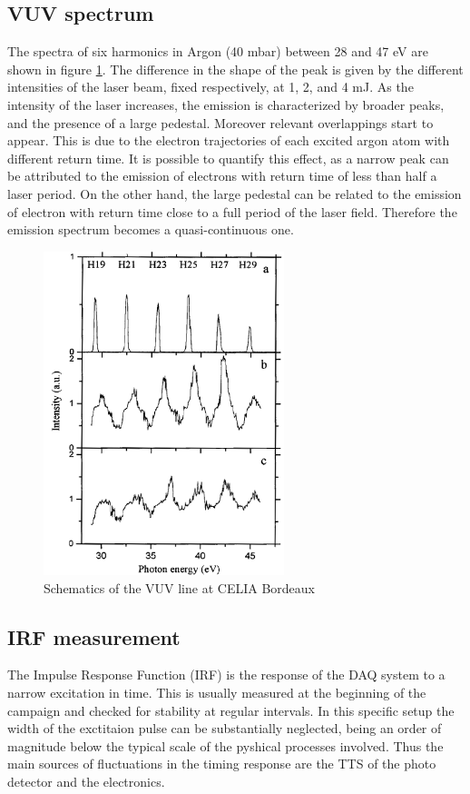 \subsection{VUV spectrum}
The spectra of six harmonics in Argon (40 mbar) between 28 and 47 eV are shown in figure \ref{fig:VUV_spectrum}.
The difference in the shape of the peak is given by the different intensities of the laser beam, fixed respectively, at 1, 2, and 4 mJ.
As the intensity of the laser increases, the emission is characterized by broader peaks, and the presence of a large pedestal.
Moreover relevant overlappings start to appear.
This is due to the electron trajectories of each excited argon atom with different return time.
It is possible to quantify this effect, as a narrow peak can be attributed to the emission of electrons with return time of less than half a laser period.
On the other hand, the large pedestal can be related to the emission of electron with return
time close to a full period of the laser field.
Therefore the emission spectrum becomes a quasi-continuous one.

\begin{figure}[htbp]
\begin{center}
\includegraphics[width=7cm]{../Pictures/Chapter_7/VUV_spectrum.png}
\end{center}
\caption[VUV spectrum]{Schematics of the VUV line at CELIA Bordeaux \cite{Martin2001}}
\label{fig:VUV_spectrum}
\end{figure}

\subsection{IRF measurement}
The Impulse Response Function (IRF) is the response of the DAQ system to a narrow excitation in time. This is usually measured at the beginning of the campaign and checked for stability at regular intervals.
In this specific setup the width of the exctitaion pulse can be substantially neglected, being an order of magnitude below the typical scale of the pyshical processes involved. Thus the main sources of fluctuations in the timing response are the TTS of the photo detector and the electronics.

